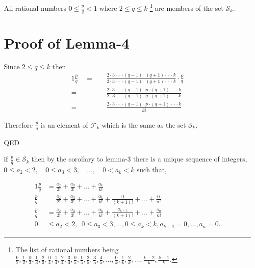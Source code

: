 \documentclass{article}
\begin{document}
All rational numbers
\(0\le{}\frac{p}{q}<1\)
where
\(2\le{}q\le{k}\)
\footnote{The list of
rational numbers being \(
\frac{0}{2},
\frac{1}{2},
\frac{0}{3},
\frac{1}{3},
\frac{2}{3},
\frac{0}{4},
\frac{1}{4},
\frac{2}{4},
\frac{3}{4},
\frac{0}{5},
\frac{1}{5},
\frac{2}{5},
\frac{3}{5},
\frac{4}{5},
\dots{},
\frac{0}{k},
\frac{1}{k},
\frac{2}{k},
\dots{},
\frac{k-2}{k},
\frac{k-1}{k}\).}
are members of the set \(\mathcal{S}_k\).

\section*{Proof of Lemma-4}
Since
\(2\le{}q\le{k}\)
then
{\normalsize
\bgroup                                  %
\setlength{\abovedisplayskip}{0pt}       %
\begin{alignat*}{1}
\frac{p}{q}\quad =\quad &\frac
{2\cdot{}3\cdot{}\cdot{}\cdot{}(q-1)\cdot{}(q+1)\cdot{}\cdot{}\cdot{}k}
{2\cdot{}3\cdot{}\cdot{}\cdot{}(q-1)\cdot{}(q+1)\cdot{}\cdot{}\cdot{}k} \cdot{} \frac{p}{q}\\
=\quad &\frac
{2\cdot{}3\cdot{}\cdot{}\cdot{}(q-1)\cdot{}p\cdot{}(q+1)\cdot{}\cdot{}\cdot{}k}
{2\cdot{}3\cdot{}\cdot{}\cdot{}(q-1)\cdot{}q\cdot{}(q+1)\cdot{}\cdot{}\cdot{}k}\\
=\quad &\frac
{2\cdot{}3\cdot{}\cdot{}\cdot{}(q-1)\cdot{}p\cdot{}(q+1)\cdot{}\cdot{}\cdot{}k}
{k!}
\end{alignat*}
\egroup
}

Therefore \(\frac{p}{q}\) is an element of \(\mathcal{F}_k\) which is the same as the set \(\mathcal{S}_k\).\par
QED


if \(\frac{p}{q} \in{} \mathcal{S}_k\) then by the corollary to lemma-3 there is a unique sequence 
of integers,\newline
{\small \(0\le{}a_2<2,\quad 0\le{}a_3<3,\quad \dots{},\quad 0<a_k<k\)}
such that,

{\small
\bgroup                                  %
\setlength{\abovedisplayskip}{0pt}
\begin{alignat*}{1}
\frac{p}{q} &= \frac{a_2}{2!} + \frac{a_3}{3!} + \dots{} + \frac{a_k}{k!}\\
\frac{p}{q} &= \frac{a_2}{2!} + \frac{a_3}{3!} + \dots{} + \frac{a_k}{k!} + \frac{0}{(k+1)!} + \dots{} + \frac{0}{n!}\\
\frac{p}{q} &= \frac{a_2}{2!} + \frac{a_3}{3!} + \dots{} + \frac{a_k}{k!} + \frac{a_{k+1}}{(k+1)!} + \dots{} + \frac{a_n}{n!}\\
0 &\le{} a_2 < 2,\enspace 0 \le{} a_3 < 3, \dots{}, 0 \le{} a_k < k, a_{k+1} = 0, \dots{}, a_n = 0.
\end{alignat*}
\egroup
}
\end{document}
